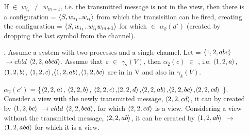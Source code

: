 \begin{itemize}
If $\in$  $w_{i_l}$ $\neq$ $w_{m+1}$, i.e. the transmitted message is not in the view, then there is a configuration  = $\langle S, w_{i_1}..w_{i_l}\rangle$ from which the transisition  can be fired, creating the configuration  = $\langle S, w_{i_1}..w_{i_l}w_{m+1}\rangle$ for which  $\in$ $\alpha_k(d')$ (created by dropping the last symbol from the channel).


. Assume a system with two processes and a single channel. Let  = $\langle1,2,abc\rangle$ $\rightarrow{ch!d}$ $\langle2,2,abcd\rangle$. Assume that $\emph{c}$ $\in$ $\gamma_2(V)$, then $\alpha_2(c)$ $\in$ , i.e. 
$\langle1,2,a\rangle$, $\langle1,2,b\rangle$, $\langle1,2,c\rangle$,$\langle1,2,ab\rangle$,$\langle1,2,bc\rangle$ are in in V and also in $\gamma_k(V)$.

$\alpha_2(c')$ = \{$\langle2,2,a\rangle$, $\langle2,2,b\rangle$, $\langle2,2,c\rangle$,$\langle2,2,d\rangle$,$\langle2,2,ab\rangle$,$\langle2,2,bc\rangle$,$\langle2,2,cd\rangle$ \}. Consider a view with the newly transmitted message, $\langle2,2,cd\rangle$, it can by created by $\langle1,2,bc\rangle$ $\rightarrow{ch!d}$ $\langle2,2,bcd\rangle$, for which $\langle2,2,cd\rangle$ is a view. Considering a view without the transmitted message, $\langle2,2,ab\rangle$, it can be created by 
$\langle1,2,ab\rangle$ $\rightarrow$ $\langle1,2,abd\rangle$ for which it is a view.

\end{itemize}
